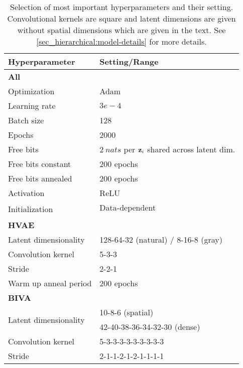{\begin{table}[t]
    \caption[Selection of most important hyperparameters.]{ Selection of most important hyperparameters and their setting. Convolutional kernels are square and latent dimensions are given without spatial dimensions which are given in the text. See \cref{sec_hierarchical:model-details} for more details.}
    \label{tab_hierarchical:hyperparameters}
    \centering
    \begin{tabular}{ll}
        \toprule
        Hyperparameter & Setting/Range \\
        \midrule
        \multicolumn{2}{l}{\textbf{All}} \\
        \midrule
        Optimization & Adam \parencite{kingma_adam_2015} \\
        Learning rate & $3e-4$ \\
        Batch size & 128 \\
        Epochs & 2000 \\
        Free bits & $\SI{2}{nats}$ per ${\mathbf{z}}_i$ shared across latent dim. \\
        Free bits constant & 200 epochs \\
        Free bits annealed & 200 epochs \\
        Activation & ReLU \\
        \multirow{2}{*}{Initialization} & Data-dependent \\
        & \parencite{salimans_weight_2016} \\
        \midrule
        \multicolumn{2}{l}{\textbf{HVAE}} \\
        Latent dimensionality & 128-64-32 (natural) / 8-16-8 (gray) \\
        Convolution kernel & 5-3-3 \\
        Stride & 2-2-1 \\
        Warm up anneal period & 200 epochs \\
        \midrule
        \multicolumn{2}{l}{\textbf{BIVA}} \\
        \multirow{2}{*}{Latent dimensionality} & 10-8-6 (spatial) \\
        & 42-40-38-36-34-32-30 (dense) \\
        Convolution kernel & 5-3-3-3-3-3-3-3-3-3 \\
        Stride & {2-1-1-2-1-2-1-1-1-1} \\
        \bottomrule
    \end{tabular}
\end{table}


}
